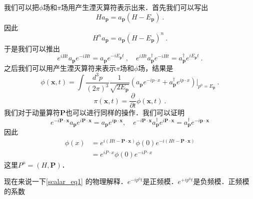 我们可以把$\phi$场和$\pi$场用产生湮灭算符表示出来．首先我们可以写出
\begin{equation}
H a_{\mathbf p} = a_{\mathbf p} (H - E_{\mathbf p})~.
\end{equation}
因此
\begin{equation}
H^n a_{\mathbf p} = a_{\mathbf p} (H - E_{\mathbf p})^n~.
\end{equation}
于是我们可以推出
\begin{equation}
e^{iHt} a_{\mathbf p} e^{-iHt} = a_{\mathbf p} e^{-i E_{\mathbf p}t}~, \quad e^{iHt} a^\dagger_{\mathbf p} e^{-iHt} = a^\dagger_{\mathbf p} e^{iE_{\mathbf p}t} ~.
\end{equation}
之后我们可以用产生湮灭算符来表示$\pi$场和$\phi$场，结果是
\begin{equation}\label{scalar_eq1}
\phi(\mathbf x,t)= \int \frac{d^3 p }{(2\pi)^3} \frac{1}{\sqrt{2E_{\mathbf p}}} (a_{\mathbf p} e^{-i p \cdot x} + a^\dagger_{\mathbf p} e^{i p \cdot x}) \bigg|_{p^0 = E_{\mathbf p}}~.
\end{equation}
\begin{equation}
\pi(\mathbf x, t) = \frac{\partial}{\partial t} \phi(\mathbf x, t)~.
\end{equation}
我们对于动量算符$\mathbf P$也可以进行同样的操作．我们可以证明
\begin{equation}
e^{-i \mathbf{P} \cdot \mathbf{x}} a_{\mathbf{p}} e^{i \mathbf{P} \cdot \mathbf{x}}=a_{\mathbf{p}} e^{i \mathbf{p} \cdot \mathbf{x}}, \quad e^{-i \mathbf{P} \cdot \mathbf{x}} a_{\mathbf{p}}^{\dagger} e^{i \mathbf{P} \cdot \mathbf{x}}=a_{\mathbf{p}}^{\dagger} e^{-i \mathbf{p} \cdot \mathbf{x}}
\end{equation}
因此
\begin{equation}
\begin{aligned}
\phi(x) &=e^{i(H t-\mathbf{P} \cdot \mathbf{x})} \phi(0) e^{-i(H t-\mathbf{P} \cdot \mathbf{x})} \\
&=e^{i P \cdot x} \phi(0) e^{-i P \cdot x}
\end{aligned}
\end{equation}
这里$P^\mu = (H,\mathbf P)$．

现在来说一下\autoref{scalar_eq1} 的物理解释．$e^{-i p^0 t}$是正频模．$e^{+i p^0 t}$是负频模．正频模的系数


